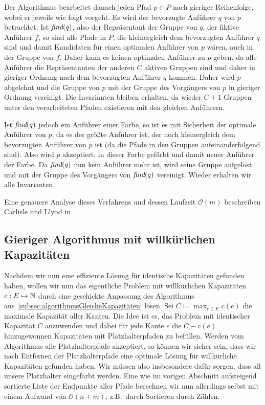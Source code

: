 Der Algorithmus bearbeitet danach jeden Pfad $p \in P$ nach gieriger Reihenfolge, wobei er jeweils wie folgt vorgeht.
Es wird der bevorzugte Anführer $q$ von $p$ betrachtet:
Ist $\text{\em find}(q)$, also der Repräsentant der Gruppe von $q$, der fiktive Anführer $f$, so sind alle Pfade in $P$, die kleinergleich dem bevorzugten Anführer $q$
sind und damit Kandidaten für einen optimalen Anführer von $p$ wären, auch in der Gruppe von $f$. Daher kann es keinen optimalen Anführer zu $p$ geben,
da alle Anführer die Repräsentanten der anderen $C$ aktiven Gruppen sind und daher in gieriger Ordnung nach dem bevorzugten Anführer $q$ kommen.
Daher wird $p$ abgelehnt und die Gruppe von $p$ mit der Gruppe des Vorgängers von $p$ in gieriger Ordnung vereinigt.
Die Invarianten bleiben erhalten, da wieder $C+1$ Gruppen unter den verarbeiteten Pfaden existieren mit den gleichen
Anführern.

Ist $\text{\em find}(q)$ jedoch ein Anführer einer Farbe, so ist es mit Sicherheit der optimale Anführer von $p$, da es der größte
Anführer ist, der noch kleinergleich dem bevorzugten Anführer von $p$ ist (da die Pfade in den Gruppen
aufeinanderfolgend sind).
Also wird $p$ akzeptiert, in dieser Farbe gefärbt und damit neuer Anführer der Farbe.
Da $\text{\em find}(q)$ nun kein Anführer mehr ist, wird seine Gruppe aufgelöst und mit der Gruppe des Vorgängers von $\text{\em find}(q)$
vereinigt.
Wieder erhalten wir alle Invarianten.

Eine genauere Analyse dieses Verfahrens und dessen Laufzeit $\mathcal O(m)$ beschreiben Carlisle und Llyod in~\cite{carlisle}.

\subsection{Gieriger Algorithmus mit willkürlichen Kapazitäten}\label{subsec:anpassenAnWillkürlicheKapazitäten}

Nachdem wir nun eine effiziente Lösung für identische Kapazitäten gefunden haben, wollen wir nun das eigentliche Problem mit
willkürlichen Kapazitäten $c: E \mapsto \mathbb N$ durch eine geschickte Anpassung des Algorithmus aus~\ref{subsec:algorithmusGleicheKapazitäten} lösen.
Sei $C \coloneqq \max_{e \in E} c(e)$ die maximale Kapazität aller Kanten.
Die Idee ist es, das Problem mit identischer Kapazität $C$ anzuwenden und dabei für jede Kante $e$ die $C - c(e)$
hinzugewonnen Kapazitäten mit Platzhalterpfaden zu befüllen.
Werden vom Algorithmus alle Platzhalterpfade akzeptiert, so können wir sicher sein, dass wir nach Entfernen der
Platzhalterpfade eine optimale Lösung für willkürliche Kapazitäten gefunden haben.
Wir müssen also insbesondere dafür sorgen, dass all unsere Platzhalter eingefärbt werden.
Eine wie im vorigen Abschnitt aufsteigend sortierte Liste der Endpunkte aller Pfade berechnen wir nun allerdings selbst mit einem Aufwand von $\mathcal O(n+m)$, z.B.\ durch Sortieren durch Zählen.

